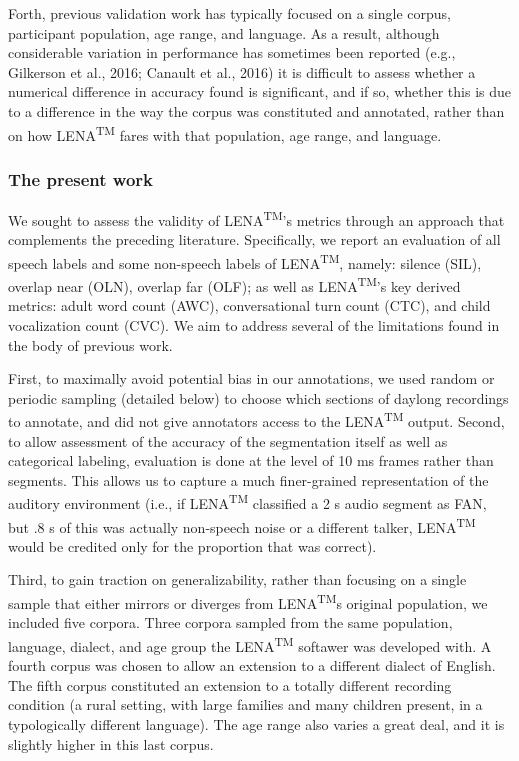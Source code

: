 \documentclass[english,table,man,floatsintext]{apa6}
\begin{document}
Forth, previous validation work has typically focused on a single corpus, participant population, age range, and language. As a result, although considerable variation in performance has sometimes been reported (e.g., Gilkerson et al., 2016; Canault et al., 2016) it is difficult to assess whether a numerical difference in accuracy found is significant, and if so, whether this is due to a difference in the way the corpus was constituted and annotated, rather than on how LENA\textsuperscript{TM} fares with that population, age range, and language.

\hypertarget{the-present-work}{%
\subsubsection{The present work}\label{the-present-work}}

We sought to assess the validity of LENA\textsuperscript{TM}'s metrics through an approach that complements the preceding literature. Specifically, we report an evaluation of all speech labels and some non-speech labels of LENA\textsuperscript{TM}, namely: silence (SIL), overlap near (OLN), overlap far (OLF); as well as LENA\textsuperscript{TM}'s key derived metrics: adult word count (AWC), conversational turn count (CTC), and child vocalization count (CVC). We aim to address several of the limitations found in the body of previous work.

First, to maximally avoid potential bias in our annotations, we used random or periodic sampling (detailed below) to choose which sections of daylong recordings to annotate, and did not give annotators access to the LENA\textsuperscript{TM} output. Second, to allow assessment of the accuracy of the segmentation itself as well as categorical labeling, evaluation is done at the level of 10 ms frames rather than segments. This allows us to capture a much finer-grained representation of the auditory environment (i.e., if LENA\textsuperscript{TM} classified a 2 s audio segment as FAN, but .8 s of this was actually non-speech noise or a different talker, LENA\textsuperscript{TM} would be credited only for the proportion that was correct).

Third, to gain traction on generalizability, rather than focusing on a single sample that either mirrors or diverges from LENA\textsuperscript{TM}s original population, we included five corpora. Three corpora sampled from the same population, language, dialect, and age group the LENA\textsuperscript{TM} softawer was developed with. A fourth corpus was chosen to allow an extension to a different dialect of English. The fifth corpus constituted an extension to a totally different recording condition (a rural setting, with large families and many children present, in a typologically different language). The age range also varies a great deal, and it is slightly higher in this last corpus.
\end{document}
